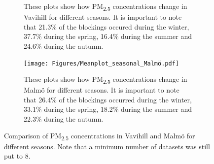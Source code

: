\begin{figure}[H]
\begin{subfigure}[b]{0.49\textwidth}
        \caption{These plots show how PM\textsubscript{2.5} concentrations change in Vavihill for different seasons. It is important to note that 21.3\% of the blockings occured during the winter, 37.7\% during the spring, 16.4\% during the summer and 24.6\% during the autumn.}
        \label{fig:Meanplot_seasonal_Vavihill}
    \end{subfigure}
    \hfill
    \begin{subfigure}[b]{0.49\textwidth}
        \centering
        \texttt{[image: Figures/Meanplot\_seasonal\_Malmö.pdf]}
        \caption{These plots show how PM\textsubscript{2.5} concentrations change in Malmö for different seasons. It is important to note that 26.4\% of the blockings occurred during the winter, 33.1\% during the spring, 18.2\% during the summer and 22.3\% during the autumn.}
        \label{fig:Meanplot_seasonal_Malmö}
    \end{subfigure}
    \caption{Comparison of PM\textsubscript{2.5} concentrations in Vavihill and Malmö for different seasons. Note that a minimum number of datasets was still put to 8. }
    \label{fig:PM25_seasons}
\end{figure}


